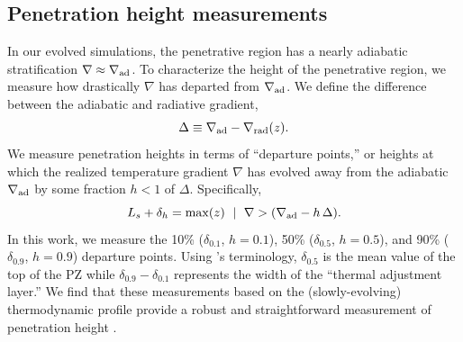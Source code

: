 \documentclass[twocolumn]{aastex631}
\newcommand{\gradrad}{\ensuremath{\nabla_{\rm{rad}}}}
\newcommand{\gradad}{\ensuremath{\nabla_{\rm{ad}}}}
\newcommand{\justgrad}{\ensuremath{\nabla}}
\begin{document}
\subsection{Penetration height measurements}
In our evolved simulations, the penetrative region has a nearly adiabatic stratification $\justgrad \approx \gradad$.
To characterize the height of the penetrative region, we measure how drastically $\justgrad$ has departed from $\gradad$.
We define the difference between the adiabatic and radiative gradient,
\begin{equation}
\Delta \equiv \gradad - \gradrad(z).
\end{equation}
We measure penetration heights in terms of ``departure points,'' or heights at which the realized temperature gradient $\justgrad$ has evolved away from the adiabatic $\gradad$ by some fraction $h < 1$ of $\Delta$.
Specifically,
\begin{equation}
L_s + \delta_{h} = \mathrm{max}(z) \,\,\mid\,\, \justgrad > (\gradad - h\,\Delta).
\label{eqn:delta_p_measures}
\end{equation}
In this work, we measure the 10\% ($\delta_{0.1}$, $h=0.1$), 50\% ($\delta_{0.5}$, $h=0.5$), and 90\% ($\delta_{0.9}$, $h=0.9$) departure points.
Using \citet{zahn1991}'s terminology, $\delta_{0.5}$ is the mean value of the top of the PZ while $\delta_{0.9} - \delta_{0.1}$ represents the width of the ``thermal adjustment layer.''
We find that these measurements based on the (slowly-evolving) thermodynamic profile provide a robust and straightforward measurement of penetration height \citep[for a discussion of alternate measurement choices, see][]{pratt_etal_2017}.
\end{document}
